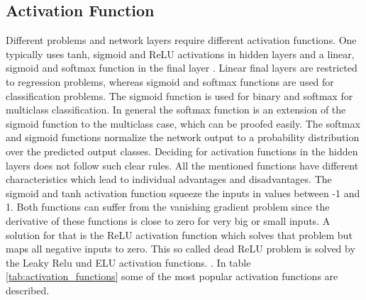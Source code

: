 \subsection{Activation Function}
Different problems and network layers require different activation functions. One typically uses tanh, sigmoid and ReLU activations in hidden layers and a linear, sigmoid and softmax function in the final layer \cite{Brownlee2021}. Linear final layers are restricted to regression problems, whereas sigmoid and softmax functions are used for classification problems. The sigmoid function is used for binary and softmax for multiclass classification. In general the softmax function is an extension of the sigmoid function to the multiclass case, which can be proofed easily. The softmax and sigmoid functions normalize the network output to a probability distribution over the predicted output classes. Deciding for activation functions in the hidden layers does not follow such clear rules. All the mentioned functions have different characteristics which lead to individual advantages and disadvantages. The sigmoid and tanh activation function squeeze the inputs in values between -1 and 1. Both functions can suffer from the vanishing gradient problem since the derivative of these functions is close to zero for very big or small inputs. A solution for that is the ReLU activation function which solves that problem but maps all negative inputs to zero. This so called dead ReLU problem is solved by the Leaky Relu und ELU activation functions.  \cite{Brownlee2021}. In table \ref{tab:activation_functions} some of the most popular activation functions are described. \newline
\newline

